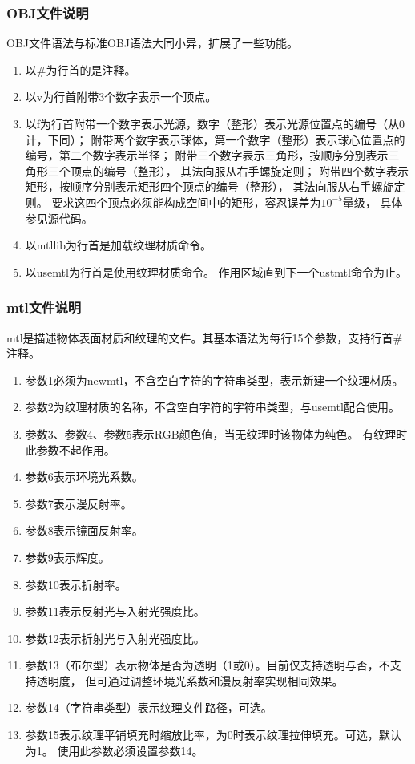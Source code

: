 \subsubsection{OBJ文件说明}
OBJ文件语法与标准OBJ语法大同小异，扩展了一些功能。%
\begin{enumerate}
\item
以\#为行首的是注释。
\item
以v为行首附带3个数字表示一个顶点。%
\item
以f为行首附带一个数字表示光源，数字（整形）表示光源位置点的编号（从0计，下同）；%
附带两个数字表示球体，第一个数字（整形）表示球心位置点的编号，第二个数字表示半径；%
附带三个数字表示三角形，按顺序分别表示三角形三个顶点的编号（整形），%
其法向服从右手螺旋定则；%
附带四个数字表示矩形，按顺序分别表示矩形四个顶点的编号（整形），%
其法向服从右手螺旋定则。%
要求这四个顶点必须能构成空间中的矩形，容忍误差为$10^{-5}$量级，%
具体参见源代码。%
\item
以mtllib为行首是加载纹理材质命令。
\item
以usemtl为行首是使用纹理材质命令。%
作用区域直到下一个ustmtl命令为止。
\end{enumerate}

\subsubsection{mtl文件说明}
mtl是描述物体表面材质和纹理的文件。其基本语法为每行15个参数，支持行首\#注释。
\begin{enumerate}
\item
参数1必须为newmtl，不含空白字符的字符串类型，表示新建一个纹理材质。
\item
参数2为纹理材质的名称，不含空白字符的字符串类型，与usemtl配合使用。
\item
参数3、参数4、参数5表示RGB颜色值，当无纹理时该物体为纯色。%
有纹理时此参数不起作用。
\item
参数6表示环境光系数。
\item
参数7表示漫反射率。
\item
参数8表示镜面反射率。
\item
参数9表示辉度。
\item
参数10表示折射率。
\item
参数11表示反射光与入射光强度比。
\item
参数12表示折射光与入射光强度比。
\item
参数13（布尔型）表示物体是否为透明（1或0）。目前仅支持透明与否，不支持透明度，%
但可通过调整环境光系数和漫反射率实现相同效果。
\item
参数14（字符串类型）表示纹理文件路径，可选。
\item 
参数15表示纹理平铺填充时缩放比率，为0时表示纹理拉伸填充。可选，默认为1。%
使用此参数必须设置参数14。
\end{enumerate}

